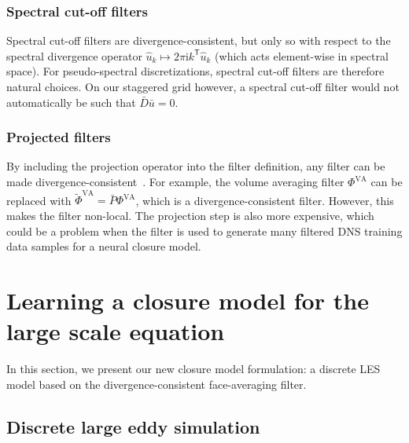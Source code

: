 \documentclass[preprint]{elsarticle}
\newcommand{\R}[1]{}
\newcommand{\revone}[1]{#1}
\begin{document}
\subsubsection{Spectral cut-off filters}

Spectral cut-off filters are divergence-consistent, but only so with respect to
the spectral divergence operator $\hat{u}_k \mapsto 2 \pi \mathrm{i}
k^\mathsf{T} \hat{u}_k$ (which acts element-wise in spectral space). For
pseudo-spectral discretizations, spectral cut-off filters are therefore natural
choices. On our staggered grid however, a spectral cut-off filter would not
automatically be such that $\bar{D} \bar{u} = 0$.

\subsubsection{Projected filters}

By including the projection operator into the filter definition, any filter can
be made divergence-consistent~\cite{Trias2011}. For example, the volume
averaging filter $\Phi^\text{VA}$ can be replaced with $\tilde{\Phi}^\text{VA} =
\bar{P} \Phi^\text{VA}$, which is a divergence-consistent filter. However, this
makes the filter non-local. The projection step is also more expensive, which
could be a problem when the filter is used to generate many filtered DNS
training data samples for a neural closure model.

\section{Learning a closure model for the large scale equation} \label{sec:les}

In this section, we present our new closure model formulation: a discrete LES
model based on the divergence-consistent \R{novel6} \revone{ face-averaging filter}.

\subsection{Discrete large eddy simulation} \label{sec:discrete_les}
\end{document}

